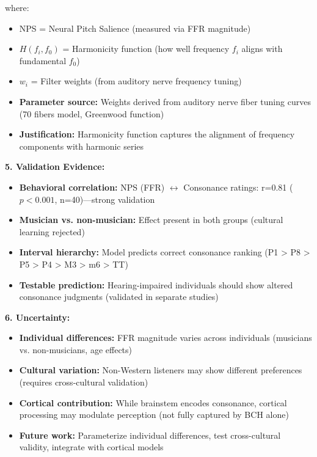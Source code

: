 \documentclass[9pt,onecolumn]{article}
\begin{document}
where:
\begin{itemize}[leftmargin=*, topsep=1pt, itemsep=1pt]
    \item NPS = Neural Pitch Salience (measured via FFR magnitude)
    \item $H(f_i, f_0)$ = Harmonicity function (how well frequency $f_i$ aligns with fundamental $f_0$)
    \item $w_i$ = Filter weights (from auditory nerve frequency tuning)
    \item \textbf{Parameter source:} Weights derived from auditory nerve fiber tuning curves (70 fibers model, Greenwood function)
    \item \textbf{Justification:} Harmonicity function captures the alignment of frequency components with harmonic series
\end{itemize}

\textbf{5. Validation Evidence:}
\begin{itemize}[leftmargin=*, topsep=1pt, itemsep=1pt]
    \item \textbf{Behavioral correlation:} NPS (FFR) $\leftrightarrow$ Consonance ratings: r=0.81 ($p<0.001$, n=40)---strong validation
    \item \textbf{Musician vs. non-musician:} Effect present in both groups (cultural learning rejected)
    \item \textbf{Interval hierarchy:} Model predicts correct consonance ranking (P1 > P8 > P5 > P4 > M3 > m6 > TT)
    \item \textbf{Testable prediction:} Hearing-impaired individuals should show altered consonance judgments (validated in separate studies)
\end{itemize}

\textbf{6. Uncertainty:}
\begin{itemize}[leftmargin=*, topsep=1pt, itemsep=1pt]
    \item \textbf{Individual differences:} FFR magnitude varies across individuals (musicians vs. non-musicians, age effects)
    \item \textbf{Cultural variation:} Non-Western listeners may show different preferences (requires cross-cultural validation)
    \item \textbf{Cortical contribution:} While brainstem encodes consonance, cortical processing may modulate perception (not fully captured by BCH alone)
    \item \textbf{Future work:} Parameterize individual differences, test cross-cultural validity, integrate with cortical models
\end{itemize}
\end{document}
